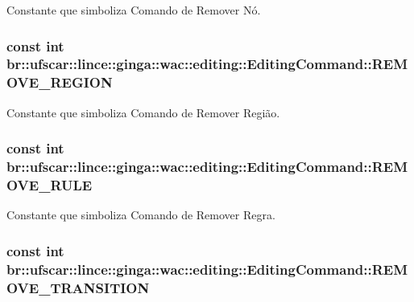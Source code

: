 Constante que simboliza Comando de Remover Nó. 

\hypertarget{classbr_1_1ufscar_1_1lince_1_1ginga_1_1wac_1_1editing_1_1EditingCommand_a44413aeba52921edecd3273abf5eec4e}{
\subsubsection[{REMOVE\_\-REGION}]{\setlength{\rightskip}{0pt plus 5cm}const int {\bf br::ufscar::lince::ginga::wac::editing::EditingCommand::REMOVE\_\-REGION}}}
\label{classbr_1_1ufscar_1_1lince_1_1ginga_1_1wac_1_1editing_1_1EditingCommand_a44413aeba52921edecd3273abf5eec4e}


Constante que simboliza Comando de Remover Região. 

\hypertarget{classbr_1_1ufscar_1_1lince_1_1ginga_1_1wac_1_1editing_1_1EditingCommand_a5dd0dac095cf928d23d71450807949d8}{
\subsubsection[{REMOVE\_\-RULE}]{\setlength{\rightskip}{0pt plus 5cm}const int {\bf br::ufscar::lince::ginga::wac::editing::EditingCommand::REMOVE\_\-RULE}}}
\label{classbr_1_1ufscar_1_1lince_1_1ginga_1_1wac_1_1editing_1_1EditingCommand_a5dd0dac095cf928d23d71450807949d8}


Constante que simboliza Comando de Remover Regra. 

\hypertarget{classbr_1_1ufscar_1_1lince_1_1ginga_1_1wac_1_1editing_1_1EditingCommand_ae2166c10bacb1c75540a99e5f23e1c6f}{
\subsubsection[{REMOVE\_\-TRANSITION}]{\setlength{\rightskip}{0pt plus 5cm}const int {\bf br::ufscar::lince::ginga::wac::editing::EditingCommand::REMOVE\_\-TRANSITION}}}
\label{classbr_1_1ufscar_1_1lince_1_1ginga_1_1wac_1_1editing_1_1EditingCommand_ae2166c10bacb1c75540a99e5f23e1c6f}


